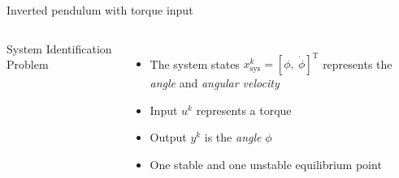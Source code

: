 \documentclass[8pt, t,
aspectratio=169,%
]{beamer}
\begin{document}
\begin{frame}{Inverted pendulum with torque input}
\begin{columns}[]
\begin{block}{System Identification Problem}
        \end{block}
        \begin{itemize}
            \item The system states $x_{\text{sys}}^k = [\phi, ~ \dot{\phi}]^{\mathrm{T}}$ represents the \emph{angle} and \emph{angular velocity}
            \item Input $u^k$ represents a torque
            \item Output $y^k$ is the \emph{angle} $\phi$
            \item One stable and one unstable equilibrium point         
        \end{itemize}

        \vspace{-0.7cm}
        

\end{columns}
\end{frame}
\end{document}
